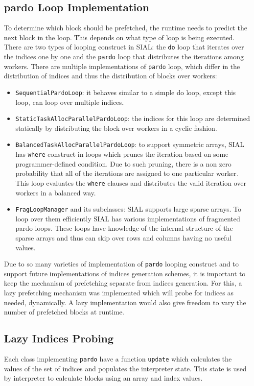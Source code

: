 \subsection{pardo Loop Implementation}
To determine which block should be prefetched, the runtime needs to predict
the next block in the loop. This depends on what type of loop is being executed.
There are two types of looping construct in SIAL: the \texttt{do} loop that iterates
over the indices one by one and the \texttt{pardo} loop that distributes the
iterations among workers. There are multiple implementations of \texttt{pardo} loop, which differ
in the distribution of indices and thus the distribution of blocks over workers:
\begin{itemize}
\item \texttt{SequentialPardoLoop}: it behaves similar to a simple do loop,
  except this loop, can loop over multiple indices.
\item \texttt{StaticTaskAllocParallelPardoLoop}: the indices for this loop are
  determined statically by distributing the block over workers in a cyclic fashion.
\item \texttt{BalancedTaskAllocParallelPardoLoop}: to support symmetric arrays,
  SIAL has \texttt{where} construct in loops which prunes the iteration based on
  some programmer-defined condition. Due to such pruning, there is a non zero
  probability that all of the iterations are assigned to one particular worker.
  This loop evaluates the \texttt{where} clauses and distributes the valid iteration
  over workers in a balanced way.
\item \texttt{FragLoopManager} and its subclasses: SIAL supports large sparse
  arrays. To loop over them efficiently SIAL has various implementations of
  fragmented pardo loops. These loops have knowledge of the internal structure of the
  sparse arrays and thus can skip over rows and columns having no useful values.
\end{itemize}
Due to so many varieties of implementation of \texttt{pardo} looping construct
and to support future implementations of indices generation schemes, it is
important to keep the mechanism of prefetching separate from indices generation.
For this, a lazy prefetching mechanism was implemented which will probe for indices
as needed, dynamically. A lazy implementation would also give freedom to vary the number
of prefetched blocks at runtime.

\subsection{Lazy Indices Probing}
Each class implementing \texttt{pardo} have a function \texttt{update} which
calculates the values of the set of indices and populates the interpreter state. This
state is used by interpreter to calculate blocks using an array and index values.

